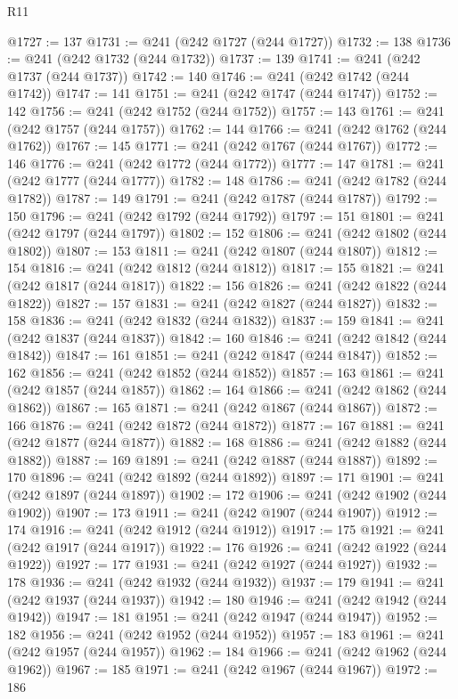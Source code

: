 \begin{lexlean}{R11}
\begin{coremodule}
@1727 := 137
@1731 := @241 (@242 @1727 (@244 @1727))
@1732 := 138
@1736 := @241 (@242 @1732 (@244 @1732))
@1737 := 139
@1741 := @241 (@242 @1737 (@244 @1737))
@1742 := 140
@1746 := @241 (@242 @1742 (@244 @1742))
@1747 := 141
@1751 := @241 (@242 @1747 (@244 @1747))
@1752 := 142
@1756 := @241 (@242 @1752 (@244 @1752))
@1757 := 143
@1761 := @241 (@242 @1757 (@244 @1757))
@1762 := 144
@1766 := @241 (@242 @1762 (@244 @1762))
@1767 := 145
@1771 := @241 (@242 @1767 (@244 @1767))
@1772 := 146
@1776 := @241 (@242 @1772 (@244 @1772))
@1777 := 147
@1781 := @241 (@242 @1777 (@244 @1777))
@1782 := 148
@1786 := @241 (@242 @1782 (@244 @1782))
@1787 := 149
@1791 := @241 (@242 @1787 (@244 @1787))
@1792 := 150
@1796 := @241 (@242 @1792 (@244 @1792))
@1797 := 151
@1801 := @241 (@242 @1797 (@244 @1797))
@1802 := 152
@1806 := @241 (@242 @1802 (@244 @1802))
@1807 := 153
@1811 := @241 (@242 @1807 (@244 @1807))
@1812 := 154
@1816 := @241 (@242 @1812 (@244 @1812))
@1817 := 155
@1821 := @241 (@242 @1817 (@244 @1817))
@1822 := 156
@1826 := @241 (@242 @1822 (@244 @1822))
@1827 := 157
@1831 := @241 (@242 @1827 (@244 @1827))
@1832 := 158
@1836 := @241 (@242 @1832 (@244 @1832))
@1837 := 159
@1841 := @241 (@242 @1837 (@244 @1837))
@1842 := 160
@1846 := @241 (@242 @1842 (@244 @1842))
@1847 := 161
@1851 := @241 (@242 @1847 (@244 @1847))
@1852 := 162
@1856 := @241 (@242 @1852 (@244 @1852))
@1857 := 163
@1861 := @241 (@242 @1857 (@244 @1857))
@1862 := 164
@1866 := @241 (@242 @1862 (@244 @1862))
@1867 := 165
@1871 := @241 (@242 @1867 (@244 @1867))
@1872 := 166
@1876 := @241 (@242 @1872 (@244 @1872))
@1877 := 167
@1881 := @241 (@242 @1877 (@244 @1877))
@1882 := 168
@1886 := @241 (@242 @1882 (@244 @1882))
@1887 := 169
@1891 := @241 (@242 @1887 (@244 @1887))
@1892 := 170
@1896 := @241 (@242 @1892 (@244 @1892))
@1897 := 171
@1901 := @241 (@242 @1897 (@244 @1897))
@1902 := 172
@1906 := @241 (@242 @1902 (@244 @1902))
@1907 := 173
@1911 := @241 (@242 @1907 (@244 @1907))
@1912 := 174
@1916 := @241 (@242 @1912 (@244 @1912))
@1917 := 175
@1921 := @241 (@242 @1917 (@244 @1917))
@1922 := 176
@1926 := @241 (@242 @1922 (@244 @1922))
@1927 := 177
@1931 := @241 (@242 @1927 (@244 @1927))
@1932 := 178
@1936 := @241 (@242 @1932 (@244 @1932))
@1937 := 179
@1941 := @241 (@242 @1937 (@244 @1937))
@1942 := 180
@1946 := @241 (@242 @1942 (@244 @1942))
@1947 := 181
@1951 := @241 (@242 @1947 (@244 @1947))
@1952 := 182
@1956 := @241 (@242 @1952 (@244 @1952))
@1957 := 183
@1961 := @241 (@242 @1957 (@244 @1957))
@1962 := 184
@1966 := @241 (@242 @1962 (@244 @1962))
@1967 := 185
@1971 := @241 (@242 @1967 (@244 @1967))
@1972 := 186

\end{coremodule}
\end{lexlean}
